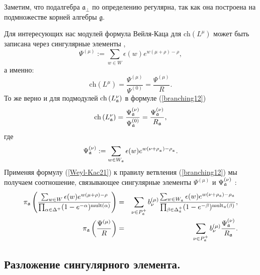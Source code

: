 Заметим, что подалгебра  $\mathfrak{a}_{\bot}$ по определению регулярна, так как она построена на подмножестве корней алгебры $\mathfrak{g}$.

Для интересующих нас модулей формула Вейля-Каца для  $\mathrm{ch}\left( L^{\mu }\right) $ может быть записана через сингулярные элементы \cite{humphreys1997introduction},
\begin{equation*}
\Psi ^{\left( \mu \right) }:=\sum\limits_{w\in W}\epsilon (w)e^{w(\mu +\rho
)-\rho },
\end{equation*}
а именно:
\begin{equation}
\mathrm{ch}\left( L^{\mu }\right) =\frac{\Psi ^{\left( \mu \right) }}{\Psi
^{\left( 0\right) }}=\frac{\Psi ^{\left( \mu \right) }}{R}.
\label{Weyl-Kac21}
\end{equation}
То же верно и для подмодулей $\mathrm{ch}\left( L_{\frak{a}}^{\nu
}\right) $ в формуле (\ref{branching12})
\begin{equation*}
\mathrm{ch}\left( L_{\frak{a}}^{\nu }\right) =\frac{\Psi _{\frak{a}}^{\left(
\nu \right) }}{\Psi _{\frak{a}}^{\left( 0\right) }}=\frac{\Psi _{\frak{a}%
}^{\left( \nu \right) }}{R_{\frak{a}}},
\end{equation*}
где
\begin{equation*}
\Psi _{\frak{a}}^{\left( \nu \right) }:=\sum\limits_{w\in W_{\frak{a}%
}}\epsilon (w)e^{w(\nu +\rho _{_{\frak{a}}})-\rho _{_{\frak{a}}}}.
\end{equation*}
Применяя формулу  (\ref{Weyl-Kac21}) к правилу ветвления  (\ref{branching12}) мы получаем соотношение, связывающее сингулярные элементы $\Psi ^{\left( \mu
\right) }$ и $\Psi _{\frak{a}}^{\left( \nu \right) }$ :
\begin{eqnarray}
\pi _{\frak{a}}\left( \frac{\sum_{w \in W}\epsilon (w )e^{w (\mu +\rho
)-\rho }}{\prod_{\alpha \in \Delta ^{+}}(1-e^{-\alpha })^{\mathrm{mult}%
(\alpha )}}\right) &=&\sum_{\nu \in P_{\frak{a}}^{+}}b_{\nu }^{(\mu )}\frac{%
\sum_{w \in W_{\frak{a}}}\epsilon (w )e^{w (\nu +\rho _{\frak{a}})-\rho _{%
\frak{a}}}}{\prod_{\beta \in \Delta _{\frak{a}}^{+}}(1-e^{-\beta })^{\mathrm{%
mult}_{\frak{a}}(\beta )}},  \notag  \label{eq:132} \\
\pi _{\frak{a}}\left( \frac{\Psi ^{\left( \mu \right) }}{R}\right)
&=&\sum_{\nu \in P_{\frak{a}}^{+}}b_{\nu }^{(\mu )}\frac{\Psi _{\frak{a}%
}^{\left( \nu \right) }}{R_{\frak{a}}}.
\end{eqnarray}

\subsection{Разложение сингулярного элемента.}

